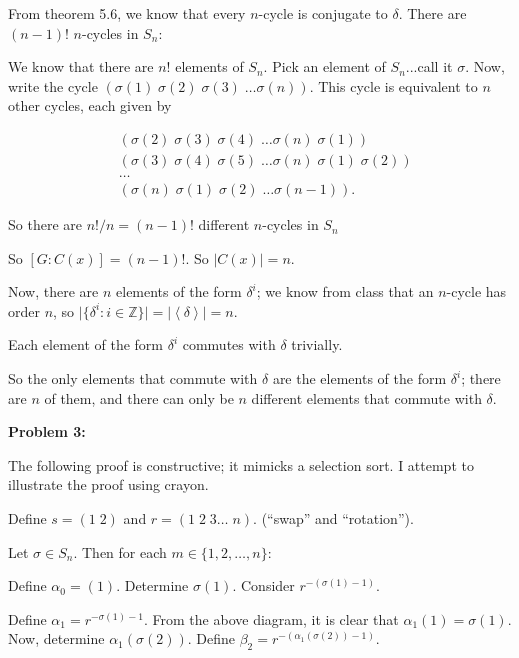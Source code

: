 \documentclass[a4paper,12pt]{article}
\newcommand{\tab}{\hspace{4mm}} %
\newcommand{\shunt}{\vspace{20mm}}
\newcommand{\absval}[1]{\lvert #1 \rvert}
\newcommand{\anbrack}[1]{\left\langle #1 \right\rangle}
\newcommand{\al}{\alpha} %
\newcommand{\be}{\beta}
\newcommand{\de}{\delta}
\newcommand{\Z}{\mathbb{Z}}
\begin{document}
From theorem 5.6, we know that every $n$-cycle is conjugate to $\de$. There are $(n-1)!$ $n$-cycles in $S_n$:

\tab We know that there are $n!$ elements of $S_n$. Pick an element of $S_n$...call it $\sigma$. Now, write the cycle $(\sigma(1) \; \sigma(2) \; \sigma(3) \; \ldots \sigma(n))$. This cycle is equivalent to $n$ other cycles, each given by

\begin{align*}
&(\sigma(2) \; \sigma(3) \; \sigma(4) \; \ldots \sigma(n) \; \sigma(1))\\
&(\sigma(3) \; \sigma(4) \; \sigma(5) \; \ldots \sigma(n) \; \sigma(1) \; \sigma(2))\\
&\ldots \\
&(\sigma(n) \; \sigma(1) \; \sigma(2) \; \ldots \sigma(n-1)).
\end{align*}

\tab So there are $n!/n = (n-1)!$ different $n$-cycles in $S_n$

So $[G:C(x)] = (n-1)!$. So $\absval{C(x)} = n$.

Now, there are $n$ elements of the form $\de^i$; we know from class that an $n$-cycle has order $n$, so $\absval{\{\de^i: i \in \Z\}}=\absval{\anbrack{\de}} = n$.

Each element of the form $\de^i$ commutes with $\de$ trivially.

So the only elements that commute with $\de$ are the elements of the form $\de^i$; there are $n$ of them, and there can only be $n$ different elements that commute with $\de$.

\shunt

{\bf Problem 3:}

The following proof is constructive; it mimicks a selection sort. I attempt to illustrate the proof using crayon.

Define $s = (1 \; 2)$ and $r = (1 \; 2 \; 3 \ldots \; n)$. (``swap'' and ``rotation'').

\shunt %

Let $\sigma \in S_n$. Then for each $m \in \{1,2, \ldots ,n\}$:

\tab Define $\al_0 = (1)$. Determine $\sigma(1)$. Consider $r^{-(\sigma(1)-1)}$.

\shunt %

\tab Define $\al_1 = r^{-\sigma(1) -1}$. From the above diagram, it is clear that $\al_1(1) = \sigma(1)$. Now, determine $\al_1(\sigma(2))$. Define $\be_2 = r^{-(\al_1(\sigma(2))-1)}$.
\end{document}
